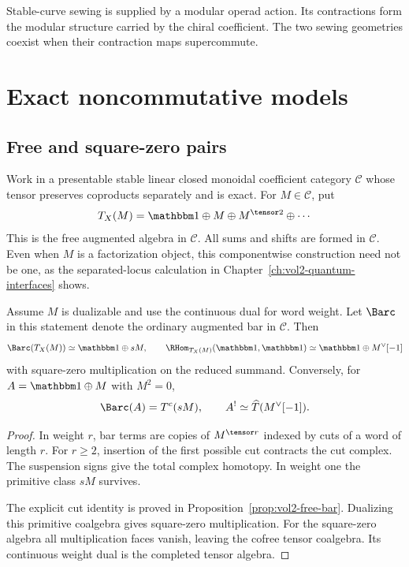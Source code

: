 Stable-curve sewing is supplied by a modular operad action. Its contractions form the modular structure carried by the chiral coefficient. The two sewing geometries coexist when their contraction maps supercommute.

\part{Exact noncommutative models}

\chapter{Free and square-zero pairs}
Work in a presentable stable linear closed monoidal coefficient category $\mathcal C$ whose
tensor preserves coproducts separately and is exact.
For $M\in\mathcal C$, put
\[
 T_X(M)=\mathbbm1\oplus M\oplus M^{\tensor2}\oplus\cdots
\]
This is the free augmented algebra in $\mathcal C$.
All sums and shifts are formed in $\mathcal C$.
Even when $M$ is a factorization object, this componentwise construction
need not be one, as the separated-locus calculation in
Chapter~\ref{ch:vol2-quantum-interfaces} shows.

\begin{theorem}
Assume $M$ is dualizable and use the continuous dual for word weight.
Let $\Barc$ in this statement denote the ordinary augmented bar in
$\mathcal C$. Then
\[
 \Barc(T_X(M))\simeq \mathbbm1\oplus sM,
 \qquad
 \RHom_{T_X(M)}(\mathbbm1,\mathbbm1)
 \simeq \mathbbm1\oplus M^\vee[-1]
\]
with square-zero multiplication on the reduced summand.
Conversely, for $A=\mathbbm1\oplus M$ with $M^2=0$,
\[
 \Barc(A)=T^c(sM),\qquad A^!\simeq \widehat T(M^\vee[-1]).
\]
\end{theorem}
\begin{proof}
In weight $r$, bar terms are copies of $M^{\tensor r}$ indexed by cuts
of a word of length $r$. For $r\ge2$, insertion of the first possible
cut contracts the cut complex. The suspension signs give the total
complex homotopy. In weight one the primitive class $sM$ survives.

The explicit cut identity is proved in
Proposition~\ref{prop:vol2-free-bar}.
Dualizing this primitive coalgebra gives square-zero multiplication.
For the square-zero algebra all multiplication faces vanish, leaving
the cofree tensor coalgebra. Its continuous weight dual is the
completed tensor algebra.
\end{proof}

